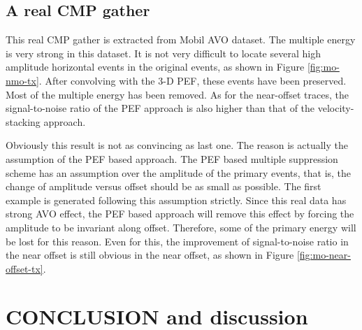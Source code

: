 \subsection{A real CMP gather}

This real CMP gather is extracted from Mobil AVO dataset. The multiple energy 
is very strong in this dataset. It is not very difficult to locate several 
high amplitude horizontal events in the original events, as shown in Figure 
\ref{fig:mo-nmo-tx}. After convolving with the 3-D PEF, these events have been 
preserved. Most of the multiple energy has been removed. As for the 
near-offset traces, the signal-to-noise ratio of the PEF approach is also 
higher than that of the velocity-stacking approach. 

Obviously this result is not as convincing as last one. The reason is 
actually the assumption of the PEF based approach. The PEF based 
multiple suppression scheme has an assumption over the amplitude of the 
primary events, that is, the change of amplitude versus offset should be as 
small as possible. The first example is generated following this assumption 
strictly. Since this real data has strong AVO effect, the PEF based approach 
will remove this effect by forcing the amplitude to be invariant along offset. 
Therefore, some of the primary energy will be lost for this reason.
Even for this, the improvement of signal-to-noise ratio in the near offset 
is still obvious in the near offset, as shown in Figure 
\ref{fig:mo-near-offset-tx}.



\section{CONCLUSION and discussion}

